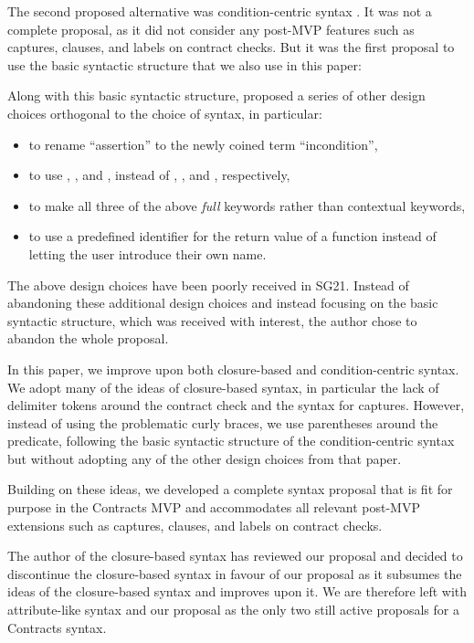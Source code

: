 The second proposed alternative was condition-centric syntax \cite{P2737R0}. It was not a complete proposal, as it did not consider any post-MVP features such as captures,  clauses, and labels on contract checks. But it was the first proposal to use the basic syntactic structure that we also use in this paper:

\phantom{~~~}

Along with this basic syntactic structure, \cite{P2737R0} proposed a series of other design choices orthogonal to the choice of syntax, in particular:
\begin{itemize}
\item to rename ``assertion'' to the newly coined term ``incondition'',
\item to use , , and , instead of , , and , respectively,
\item to make all three of the above \emph{full} keywords rather than contextual keywords,
\item to use a predefined identifier  for the return value of a function instead of letting the user introduce their own name.
\end{itemize}
The above design choices have been poorly received in SG21. Instead of abandoning these additional design choices and instead focusing on the basic syntactic structure, which was received with interest, the author chose to abandon the whole proposal.

In this paper, we improve upon both closure-based and condition-centric syntax. We adopt many of the ideas of closure-based syntax, in particular the lack of delimiter tokens around the contract check and the syntax for captures. However, instead of using the problematic curly braces, we use parentheses around the predicate, following the basic syntactic structure of the condition-centric syntax \cite{P2737R0} but without adopting any of the other design choices from that paper.

Building on these ideas, we developed a complete syntax proposal that is fit for purpose in the Contracts MVP and accommodates all relevant post-MVP extensions such as captures,  clauses, and labels on contract checks.

The author of the closure-based syntax has reviewed our proposal and decided to discontinue the closure-based syntax in favour of our proposal as it subsumes the ideas of the closure-based syntax and improves upon it. We are therefore left with attribute-like syntax and our proposal as the only two still active proposals for a Contracts syntax.


